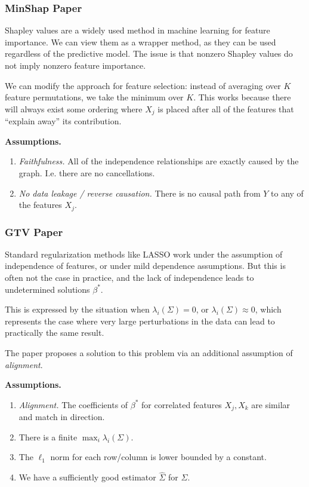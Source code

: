 \documentclass{article}
\begin{document}
\subsubsection{MinShap Paper}
Shapley values are a widely used method in machine learning for feature importance. We can view them as a wrapper method, as they can be used regardless of the predictive model. The issue is that nonzero Shapley values do not imply nonzero feature importance.

We can modify the approach for feature selection: instead of averaging over $K$ feature permutations, we take the minimum over $K$. This works because there will always exist some ordering where $X_j$ is placed after all of the features that ``explain away'' its contribution.

\textbf{Assumptions.}
\begin{enumerate}
    \item \emph{Faithfulness.} All of the independence relationships are exactly caused by the graph. I.e. there are no cancellations.
    \item \emph{No data leakage / reverse causation.} There is no causal path from $Y$ to any of the features $X_j$.
\end{enumerate}

\subsubsection{GTV Paper}
Standard regularization methods like LASSO work under the assumption of independence of features, or under mild dependence assumptions. But this is often not the case in practice, and the lack of independence leads to undetermined solutions $\beta^*$.

This is expressed by the situation when $\lambda_i(\Sigma) = 0$, or $\lambda_i(\Sigma) \approx 0$, which represents the case where very large perturbations in the data can lead to practically the same result.

The paper proposes a solution to this problem via an additional assumption of \emph{alignment}.

\textbf{Assumptions.}
\begin{enumerate}
    \item \emph{Alignment.} The coefficients of $\beta^*$ for correlated features $X_j, X_k$ are similar and match in direction.
    \item There is a finite $\max_i \lambda_i(\Sigma)$.
    \item The $\ell_1$ norm for each row/column is lower bounded by a constant.
    \item We have a sufficiently good estimator $\hat \Sigma$ for $\Sigma$.
\end{enumerate}
\end{document}

